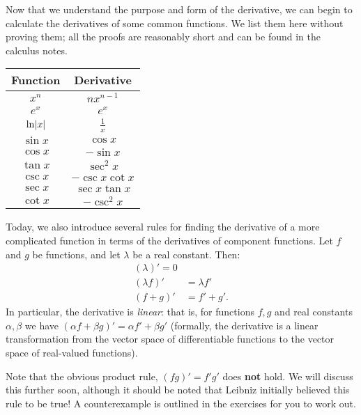 


Now that we understand the purpose and form of the derivative, we can begin to calculate
the derivatives of some common functions. We list them here without proving them; all the
proofs are reasonably short and can be found in the calculus notes.

\begin{center}
  \begin{tabular}{c|c}
    \textbf{Function} & \textbf{Derivative}\\\hline
    $ x^n $ & $ nx^{n - 1} $\\
    $ e^x $ & $ e^x $\\
    $ \ln \abs{x} $ & $ \frac{1}{x} $\\
    $ \sin x $ & $ \cos x $\\
    $ \cos x $ & $ -\sin x $\\
    $ \tan x $ & $ \sec^2 x $\\
    $ \csc x $ & $ -\csc x \cot x $\\
    $ \sec x $ & $ \sec x \tan x $\\
    $ \cot x $ & $ -\csc^2 x $
  \end{tabular}
\end{center}

Today, we also introduce several rules for finding the derivative of a more complicated function
in terms of the derivatives of component functions. Let $ f $ and $ g $ be functions, and let $ \lambda $ be a real constant. Then:
\begin{align*}
  (\lambda)' = 0\\
  (\lambda f)' &= \lambda f'\\
  (f + g)' &= f' + g'.
\end{align*}
In particular, the derivative is \textit{linear}: that is, for functions $ f, g $ and real constants $ \alpha, \beta $
we have $ (\alpha f + \beta g)' = \alpha f' + \beta g' $ (formally, the derivative is a linear transformation from the
vector space of differentiable functions to the vector space of real-valued functions).

Note that the obvious product rule, $ (fg)' = f'g' $ does \textbf{not} hold. We will discuss this further soon,
although it should be noted that Leibniz initially believed this rule to be true! A counterexample is outlined in the
exercises for you to work out.

\clearpage
